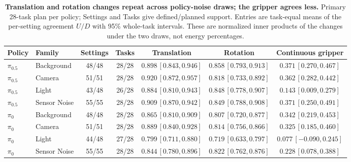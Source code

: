 \begin{table}[t]
\caption{\textbf{Translation and rotation changes repeat across policy-noise draws; the gripper agrees less.} Primary 28-task plan per policy; Settings and Tasks give defined/planned support. Entries are task-equal means of the per-setting agreement $U/D$ with 95\% whole-task intervals. These are normalized inner products of the changes under the two draws, not energy percentages.}

\centering\small
\setlength{\tabcolsep}{3.5pt}
\begin{tabular}{llccccc}
\toprule
Policy & Family & Settings & Tasks & Translation & Rotation & Continuous gripper\\
\midrule
$\pi_{0.5}$ & Background & 48/48 & 28/28 & $0.898\, [0.843,0.946]$ & $0.858\, [0.793,0.913]$ & $0.371\, [0.270,0.467]$\\
$\pi_{0.5}$ & Camera & 51/51 & 28/28 & $0.920\, [0.872,0.957]$ & $0.818\, [0.733,0.892]$ & $0.362\, [0.282,0.442]$\\
$\pi_{0.5}$ & Light & 43/48 & 26/28 & $0.884\, [0.810,0.943]$ & $0.848\, [0.778,0.907]$ & $0.143\, [0.009,0.279]$\\
$\pi_{0.5}$ & Sensor Noise & 55/55 & 28/28 & $0.909\, [0.870,0.942]$ & $0.849\, [0.788,0.908]$ & $0.371\, [0.250,0.491]$\\
\midrule
$\pi_0$ & Background & 48/48 & 28/28 & $0.865\, [0.810,0.909]$ & $0.807\, [0.720,0.877]$ & $0.342\, [0.219,0.453]$\\
$\pi_0$ & Camera & 51/51 & 28/28 & $0.889\, [0.840,0.928]$ & $0.814\, [0.756,0.866]$ & $0.325\, [0.185,0.460]$\\
$\pi_0$ & Light & 44/48 & 27/28 & $0.799\, [0.711,0.880]$ & $0.719\, [0.633,0.797]$ & $0.077\, [-0.090,0.245]$\\
$\pi_0$ & Sensor Noise & 55/55 & 28/28 & $0.844\, [0.780,0.896]$ & $0.822\, [0.762,0.876]$ & $0.228\, [0.078,0.388]$\\
\bottomrule
\end{tabular}

\label{tab:q0-consistency-primary}
\end{table}
